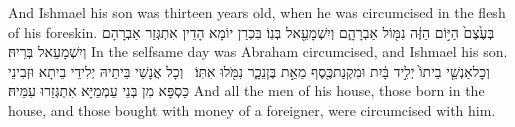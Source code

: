 {And Ishmael his son was thirteen years old, when he was circumcised in the flesh of his foreskin.}{}
{בְּעֶ֙צֶם֙ הַיּ֣וֹם הַזֶּ֔ה נִמּ֖וֹל אַבְרָהָ֑ם וְיִשְׁמָעֵ֖אל בְּנֽוֹ׃}
{בִּכְרַן יוֹמָא הָדֵין אִתְגְּזַר אַבְרָהָם וְיִשְׁמָעֵאל בְּרֵיהּ׃}
{In the selfsame day was Abraham circumcised, and Ishmael his son.}{}
{וְכׇל\maqqaf אַנְשֵׁ֤י בֵיתוֹ֙ יְלִ֣יד בָּ֔יִת וּמִקְנַת\maqqaf כֶּ֖סֶף מֵאֵ֣ת בֶּן\maqqaf נֵכָ֑ר נִמֹּ֖לוּ אִתּֽוֹ׃ \petucha }
{וְכָל אֲנָשֵׁי בֵּיתֵיהּ יְלִידֵי בֵיתָא וּזְבִינֵי כַּסְפָּא מִן בְּנֵי עַמְמַיָּא אִתְגְּזַרוּ עִמֵּיהּ׃}
{And all the men of his house, those born in the house, and those bought with money of a foreigner, were circumcised with him.}{}

